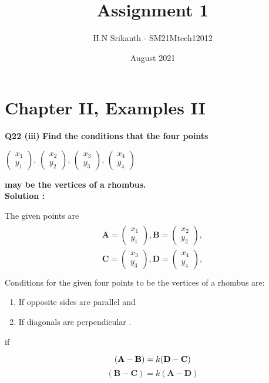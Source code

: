\documentclass{article}
\title{\textbf{\Huge Assignment 1}}
\author{\large H.N Srikanth - SM21Mtech12012}
\date{August 2021}
\begin{document}
\providecommand{\mbf}{\mathbf}

\newcommand{\myvec}[1]{\ensuremath{\begin{pmatrix}#1\end{pmatrix}}}
\let\vec\mathbf

\maketitle

\section*{Chapter II, Examples II}
\textbf{Q22 (iii)}
\textbf{Find the conditions that the four points}

\myvec{x_1\\y_1}, \myvec{x_2\\y_2},
\myvec{x_3\\y_3}, \myvec{x_4\\y_4}

\textbf{ may be the vertices of a rhombus.}\\

\textbf{Solution :}

The given points are\\
\begin{align*}
\begin{split}
\vec{A} = \myvec{x_1\\y_1}, \vec{B} =\myvec{x_2\\y_2},\\
\vec{C} =\myvec{x_3\\y_3}, \vec{D} =\myvec{x_4\\y_4},\\
\end{split}
\end{align*}
Conditions for the given four points to be the vertices of a rhombus are:
\begin{enumerate}
  \item If opposite sides are parallel and
  \item If diagonals are perpendicular .
\end{enumerate}
if

\begin{equation}\label{first_equation}
(\vec{A}-\vec{B} ) = k(\vec{D}-\vec{C} )\\
\end{equation}
\begin{equation}\label{second_equation}
(\vec{B}-\vec{C} )=k(\vec{A}-\vec{D} )
\end{equation}
\end{document}
